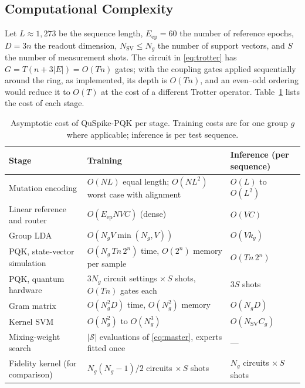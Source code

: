 \documentclass[conference]{IEEEtran}
\begin{document}
\subsection{Computational Complexity}
\label{sec:complexity}

Let $L\approx1{,}273$ be the sequence length, $E_{\mathrm{ep}}=60$ the number of reference epochs, $D=3n$ the readout dimension, $N_{\mathrm{SV}}\le N_g$ the number of support vectors, and $S$ the number of measurement shots. The circuit in \eqref{eq:trotter} has $G=T(n+3|E|)=O(Tn)$ gates; with the coupling gates applied sequentially around the ring, as implemented, its depth is $O(Tn)$, and an even--odd ordering would reduce it to $O(T)$ at the cost of a different Trotter operator. Table~\ref{tab:complexity} lists the cost of each stage.

\begin{table}[!t]
    \centering
    \caption{Asymptotic cost of QuSpike-PQK per stage. Training costs are for one group $g$ where applicable; inference is per test sequence.}
    \label{tab:complexity}
    \footnotesize
    \setlength{\tabcolsep}{5pt}
    \renewcommand{\arraystretch}{1.15}
    \begin{tabular*}{\textwidth}{@{\extracolsep{\fill}}lll@{}}
        \toprule
        Stage & Training & Inference (per sequence) \\
        \midrule
        Mutation encoding & $O(NL)$ equal length; $O(NL^2)$ worst case with alignment & $O(L)$ to $O(L^2)$ \\
        Linear reference and router & $O(E_{\mathrm{ep}}NVC)$ (dense) & $O(VC)$ \\
        Group LDA & $O(N_gV\min(N_g,V))$ & $O(Vk_g)$ \\
        PQK, state-vector simulation & $O(N_g\,Tn\,2^{n})$ time, $O(2^n)$ memory per sample & $O(Tn\,2^{n})$ \\
        PQK, quantum hardware & $3N_g$ circuit settings $\times\,S$ shots, $O(Tn)$ gates each & $3S$ shots \\
        Gram matrix & $O(N_g^2D)$ time, $O(N_g^2)$ memory & $O(N_gD)$ \\
        Kernel SVM & $O(N_g^2)$ to $O(N_g^3)$ & $O(N_{\mathrm{SV}}C_g)$ \\
        Mixing-weight search & $|\mathcal{S}|$ evaluations of \eqref{eq:master}, experts fitted once & --- \\
        \midrule
        Fidelity kernel (for comparison) & $N_g(N_g-1)/2$ circuits $\times\,S$ shots & $N_g$ circuits $\times\,S$ shots \\
        \bottomrule
    \end{tabular*}
\end{table}
\end{document}
